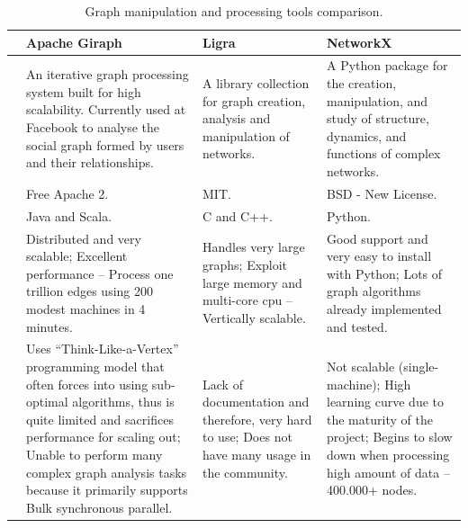 \begin{table}[H]
    \caption{Graph manipulation and processing tools comparison.}
    \label{table:graph_manipulation_and_processing_tools_comparison}
    \centering
    \begin{tabularx}{\linewidth} {
            >{\hsize=0.1\hsize}X|
            >{\hsize=1.0\hsize}X|
            >{\hsize=1.0\hsize}X|
            >{\hsize=1.0\hsize}X|}
        \cline{2-4}

        & Apache Giraph \cite{apache_giraph}
        & Ligra \cite{ligra_graph_processing_framework}
        & NetworkX \cite{networkx} \\ \hline \hline
         \multicolumn{1}{|l|}{\textbf{Description}}
         & An iterative graph processing system built for high scalability. Currently used at Facebook to analyse the social graph formed by users and their relationships.
         & A library collection for graph creation, analysis and manipulation of networks.
         & A Python package for the creation, manipulation, and study of structure, dynamics, and functions of complex networks. \\ \hline
         \multicolumn{1}{|l|}{\textbf{Licence}~\cite{Morin2012}}
         & Free Apache 2.
         & MIT.
         & BSD - New License. \\ \hline
        \multicolumn{1}{|l|}{\textbf{Supported languages}}
         & Java and Scala.
         & C and C++.
         & Python. \\ \hline
         \multicolumn{1}{|l|}{\textbf{Pros}}
         & Distributed and very scalable; \newline
        Excellent performance -- Process one trillion edges using 200 modest machines in 4 minutes.
         & Handles very large graphs; \newline
        Exploit large memory and multi-core \gls{cpu} -- Vertically scalable.
         & Good support and very easy to install with Python; \newline
        Lots of graph algorithms already implemented and tested. \newline \\ \hline
        \multicolumn{1}{|l|}{\textbf{Cons}}
        & Uses ``Think-Like-a-Vertex'' programming model that often forces into using sub-optimal algorithms, thus is quite limited and sacrifices performance for scaling out; \newline
        Unable to perform many complex graph analysis tasks because it primarily supports Bulk synchronous parallel.
         & Lack of documentation and therefore, very hard to use; \newline
        Does not have many usage in the community.
         & Not scalable (single-machine); \newline
        High learning curve due to the maturity of the project; \newline
        Begins to slow down when processing high amount of data -- 400.000+ nodes. \\ \hline
    \end{tabularx}
\end{table}

